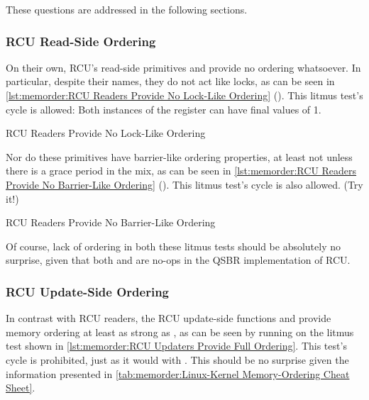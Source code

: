 These questions are addressed in the following sections.

\subsubsection{RCU Read-Side Ordering}
\label{sec:memorder:RCU Read-Side Ordering}

On their own, RCU's read-side primitives  and
 provide no ordering whatsoever.
In particular, despite their names, they do not act like locks, as can
be seen in
\cref{lst:memorder:RCU Readers Provide No Lock-Like Ordering}
().
This litmus test's cycle is allowed: Both instances of the 
register can have final values of 1.

\begin{listing}

\caption{RCU Readers Provide No Lock-Like Ordering}
\label{lst:memorder:RCU Readers Provide No Lock-Like Ordering}
\end{listing}

Nor do these primitives have barrier-like ordering properties,
at least not unless there is a grace period in the mix, as can be seen in
\cref{lst:memorder:RCU Readers Provide No Barrier-Like Ordering}
().
This litmus test's cycle is also allowed.
(Try it!)

\begin{listing}

\caption{RCU Readers Provide No Barrier-Like Ordering}
\label{lst:memorder:RCU Readers Provide No Barrier-Like Ordering}
\end{listing}

Of course, lack of ordering in both these litmus tests should be absolutely
no surprise, given that both  and 
are no-ops in the QSBR implementation of RCU\@.

\subsubsection{RCU Update-Side Ordering}
\label{sec:memorder:RCU Update-Side Ordering}

In contrast with RCU readers, the RCU update-side functions
 and 
provide memory ordering at least as strong as ,
as can be seen by running  on the litmus test shown in
\cref{lst:memorder:RCU Updaters Provide Full Ordering}.
This test's cycle is prohibited, just as it would with .
This should be no surprise given the information presented in
\cref{tab:memorder:Linux-Kernel Memory-Ordering Cheat Sheet}.

